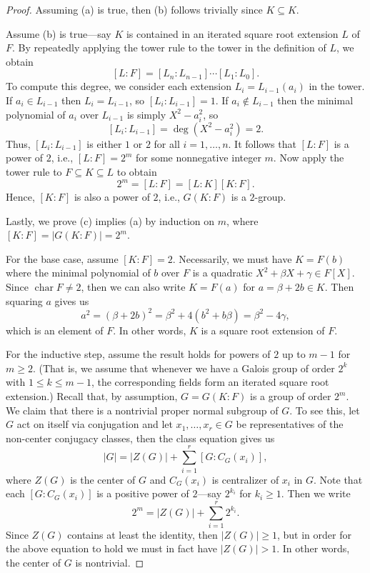 \documentclass[12pt]{article}
\theoremstyle{definition}
\newcommand{\<}{\langle}
\renewcommand{\>}{\rangle}
\newcommand{\seq}{\subseteq}
\newcommand{\Char}{\operatorname{char}}
\begin{document}
\begin{proof}
    Assuming (a) is true, then (b) follows trivially since $K \seq K$.

    Assume (b) is true---say $K$ is contained in an iterated square root extension $L$ of $F$.
    By repeatedly applying the tower rule to the tower in the definition of $L$, we obtain
    \[
        [L : F] = [L_n : L_{n-1}] \cdots [L_1 : L_0].
    \]
    To compute this degree, we consider each extension $L_i = L_{i-1}(a_i)$ in the tower.
    If $a_i \in L_{i-1}$ then $L_i = L_{i-1}$, so $[L_i : L_{i-1}] = 1$.
    If $a_i \notin L_{i-1}$ then the minimal polynomial of $a_i$ over $L_{i-1}$ is simply $X^2 - a_i^2$, so
    \[
        [L_i : L_{i-1}] = \deg(X^2 - a_i^2) = 2.
    \]
    Thus, $[L_i : L_{i-1}]$ is either $1$ or $2$ for all $i = 1, \dots, n$.
    It follows that $[L : F]$ is a power of $2$, i.e., $[L : F] = 2^m$ for some nonnegative integer $m$.
    Now apply the tower rule to $F \seq K \seq L$ to obtain
    \[
        2^m
            = [L : F]
            = [L : K][K : F].
    \]
    Hence, $[K : F]$ is also a power of $2$, i.e., $G(K : F)$ is a $2$-group.

    Lastly, we prove (c) implies (a) by induction on $m$, where $[K : F] = |G(K : F)| = 2^m$.

    For the base case, assume $[K : F] = 2$.
    Necessarily, we must have $K = F(b)$ where the minimal polynomial of $b$ over $F$ is a quadratic $X^2 + \beta X + \gamma \in F[X]$.
    Since $\Char F \ne 2$, then we can also write $K = F(a)$ for $a = \beta + 2b \in K$.
    Then squaring $a$ gives us
    \[
        a^2
            = (\beta + 2b)^2
            = \beta^2 + 4(b^2 + b\beta)
            = \beta^2 - 4\gamma,
    \]
    which is an element of $F$.
    In other words, $K$ is a square root extension of $F$.

    For the inductive step, assume the result holds for powers of $2$ up to $m - 1$ for $m \geq 2$.
    (That is, we assume that whenever we have a Galois group of order $2^k$ with $1 \leq k \leq m - 1$, the corresponding fields form an iterated square root extension.)
    Recall that, by assumption, $G = G(K : F)$ is a group of order $2^m$.
    We claim that there is a nontrivial proper normal subgroup of $G$.
    To see this, let $G$ act on itself via conjugation and let $x_1, \dots, x_r \in G$ be representatives of the non-center conjugacy classes, then the class equation gives us
    \[
        |G| = |Z(G)| + \sum_{i=1}^{r} [G : C_G(x_i)],
    \]
    where $Z(G)$ is the center of $G$ and $C_G(x_i)$ is centralizer of $x_i$ in $G$.
    Note that each $[G : C_G(x_i)]$ is a positive power of $2$---say $2^{k_i}$ for $k_i \geq 1$.
    Then we write
    \[
        2^m = |Z(G)| + \sum_{i=1}^{r} 2^{k_i}.
    \]
    Since $Z(G)$ contains at least the identity, then $|Z(G)| \geq 1$, but in order for the above equation to hold we must in fact have $|Z(G)| > 1$.
    In other words, the center of $G$ is nontrivial.
    

\end{proof}
\end{document}
